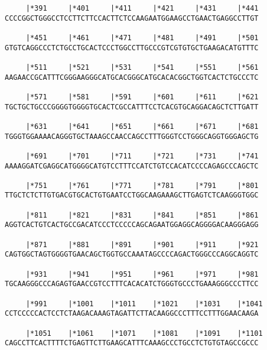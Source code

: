 \documentclass{article}
\begin{document}
\begin{Verbatim}
     |*391     |*401     |*411     |*421     |*431     |*441
CCCCGGCTGGGCCTCCTTCTTCCACTTCTCCAAGAATGGAAGCCTGAACTGAGGCCTTGT
                                                            
     |*451     |*461     |*471     |*481     |*491     |*501
GTGTCAGGCCCTCTGCCTGCACTCCCTGGCCTTGCCCGTCGTGTGCTGAAGACATGTTTC
                                                            
     |*511     |*521     |*531     |*541     |*551     |*561
AAGAACCGCATTTCGGGAAGGGCATGCACGGGCATGCACACGGCTGGTCACTCTGCCCTC
                                                            
     |*571     |*581     |*591     |*601     |*611     |*621
TGCTGCTGCCCGGGGTGGGGTGCACTCGCCATTTCCTCACGTGCAGGACAGCTCTTGATT
                                                            
     |*631     |*641     |*651     |*661     |*671     |*681
TGGGTGGAAAACAGGGTGCTAAAGCCAACCAGCCTTTGGGTCCTGGGCAGGTGGGAGCTG
                                                            
     |*691     |*701     |*711     |*721     |*731     |*741
AAAAGGATCGAGGCATGGGGCATGTCCTTTCCATCTGTCCACATCCCCAGAGCCCAGCTC
                                                            
     |*751     |*761     |*771     |*781     |*791     |*801
TTGCTCTCTTGTGACGTGCACTGTGAATCCTGGCAAGAAAGCTTGAGTCTCAAGGGTGGC
                                                            
     |*811     |*821     |*831     |*841     |*851     |*861
AGGTCACTGTCACTGCCGACATCCCTCCCCCAGCAGAATGGAGGCAGGGGACAAGGGAGG
                                                            
     |*871     |*881     |*891     |*901     |*911     |*921
CAGTGGCTAGTGGGGTGAACAGCTGGTGCCAAATAGCCCCAGACTGGGCCCAGGCAGGTC
                                                            
     |*931     |*941     |*951     |*961     |*971     |*981
TGCAAGGGCCCAGAGTGAACCGTCCTTTCACACATCTGGGTGCCCTGAAAGGGCCCTTCC
                                                            
     |*991     |*1001    |*1011    |*1021    |*1031    |*1041
CCTCCCCCACTCCTCTAAGACAAAGTAGATTCTTACAAGGCCCTTTCCTTTGGAACAAGA
                                                            
     |*1051    |*1061    |*1071    |*1081    |*1091    |*1101
CAGCCTTCACTTTTCTGAGTTCTTGAAGCATTTCAAAGCCCTGCCTCTGTGTAGCCGCCC
                                                            

\end{Verbatim}
\end{document}
